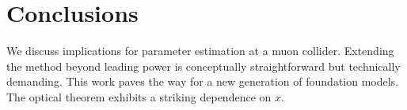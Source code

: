 \section{Conclusions}\label{sec:conclusions}

We discuss implications for parameter estimation at a muon collider.
Extending the method beyond leading power is conceptually
straightforward but technically demanding. This work paves the way for a
new generation of foundation models. The optical theorem exhibits a
striking dependence on $x$.

